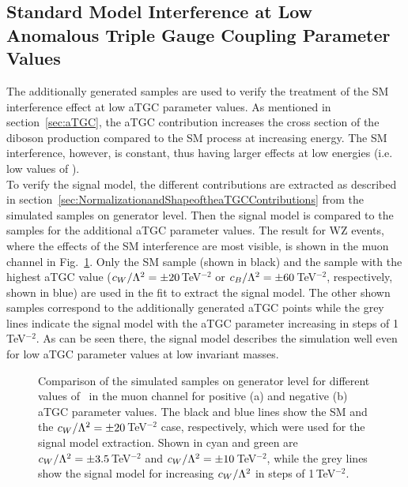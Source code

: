 \subsection{Standard Model Interference at Low Anomalous Triple Gauge Coupling Parameter Values}
\label{sec:SMint}
The additionally generated samples are used to verify the treatment of the SM interference effect at low aTGC parameter values. As mentioned in section~\ref{sec:aTGC}, the aTGC contribution increases the cross section of the diboson production compared to the SM process at increasing energy. The SM interference, however, is constant, thus having larger effects at low energies (i.e. low values of \MWV).\\

\noindent To verify the signal model, the different contributions are extracted as described in section~\ref{sec:NormalizationandShapeoftheaTGCContributions} from the simulated samples on generator level. Then the signal model is compared to the samples for the additional aTGC parameter values. The result for WZ events, where the effects of the SM interference are most visible, is shown in the muon channel in Fig.~\ref{fig:signal:smintverif_WZ_mu}. Only the SM sample (shown in black) and the sample with the highest aTGC value ($c_{W}/\Lambda^2 = \pm 20$\,TeV$^{-2}$ or $c_{B}/\Lambda^2 = \pm 60$\,TeV$^{-2}$, respectively, shown in blue) are used in the fit to extract the signal model. The other shown samples correspond to the additionally generated aTGC points while the  grey lines indicate the signal model with the aTGC parameter increasing in steps of 1\,TeV$^{-2}$. As can be seen there, the signal model describes the simulation well even for low aTGC parameter values at low invariant masses.

\begin{figure}[bh!]
	\centering
	\caption[Comparison of the simulated samples on generator level for different values of \Tccw \ in the muon channel]{Comparison of the simulated samples on generator level for different values of \Tccw \ in the muon channel for positive (a) and negative (b) aTGC parameter values. The black and blue lines show the SM and the $c_{W}/\Lambda^2 = \pm 20$\,TeV$^{-2}$ case, respectively, which were used for the signal model extraction. Shown in cyan and green are $c_{W}/\Lambda^2 = \pm 3.5$\,TeV$^{-2}$ and $c_{W}/\Lambda^2 = \pm 10$\,TeV$^{-2}$, while the grey lines show the signal model for increasing $c_{W}/\Lambda^2$ in steps of 1\,TeV$^{-2}$.}
	\label{fig:signal:smintverif_WZ_mu}
\end{figure}